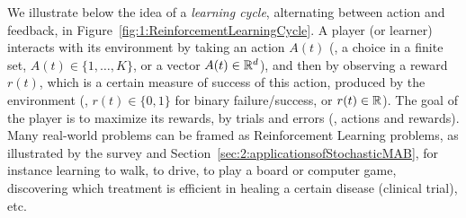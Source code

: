 

We illustrate below the idea of a \emph{learning cycle}, alternating between action and feedback,
in Figure~\ref{fig:1:ReinforcementLearningCycle}.
A player (or learner) interacts with its environment by taking an action $A(t)$ (\eg, a choice in a finite set, $A(t)\in\{1,\dots,K\}$, or a vector $A(t)\in\mathbb{R}^d$), and then by observing a reward $r(t)$, which is a certain measure of success of this action, produced by the environment (\eg, $r(t)\in\{0,1\}$ for binary failure/success, or $r(t)\in\mathbb{R}$).
The goal of the player is to maximize its rewards, by trials and errors (\ie, actions and rewards).
Many real-world problems can be framed as Reinforcement Learning problems, as illustrated by the survey \cite{bouneffouf2019survey} and Section~\ref{sec:2:applicationsofStochasticMAB}, for instance learning to walk, to drive, to play a board or computer game, discovering which treatment is efficient in healing a certain disease (clinical trial), etc.


